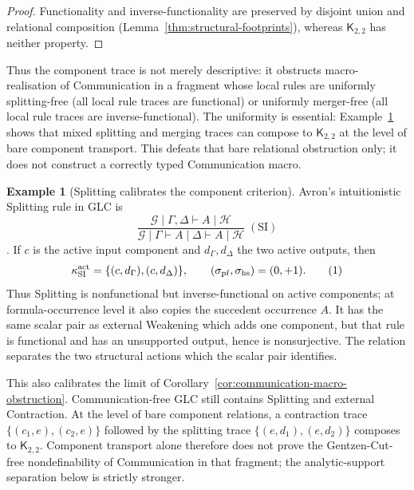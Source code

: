 \documentclass[10pt,a4paper]{article}
\theoremstyle{plain}
\theoremstyle{definition}
\newtheorem{example}[theorem]{Example}
\theoremstyle{remark}
\newcommand{\ms}{\mathrel{\vdash}}
\newcommand{\eqtag}{\refstepcounter{equation}\tag{\theequation}}
\begin{document}
\begin{proof}
Functionality and inverse-functionality are preserved by disjoint union
and relational composition
(Lemma~\ref{thm:structural-footprints}), whereas
\(\mathsf K_{2,2}\) has neither property.
\end{proof}

Thus the component trace is not merely descriptive: it obstructs
macro-realisation of Communication in a fragment whose local
rules are uniformly splitting-free (all local rule traces are functional)
or uniformly merger-free (all local rule traces are inverse-functional).  The uniformity
is essential: Example~\ref{ex:splitting-component-calibration} shows that
mixed splitting and merging traces can compose to \(\mathsf K_{2,2}\) at
the level of bare component transport.  This defeats that bare relational
obstruction only; it does not construct a correctly typed Communication
macro.

\begin{example}[Splitting calibrates the component criterion]
\label{ex:splitting-component-calibration}
Avron's intuitionistic Splitting rule in GLC is
\[
\frac{
 \mathcal G\mid\Gamma,\Delta\ms A\mid\mathcal H
}{
 \mathcal G\mid\Gamma\ms A
 \mid\Delta\ms A\mid\mathcal H
}\;(\mathrm{SI})
\]
\cite[\S III.1.2]{avron1996hypersequents}.  If \(c\) is the active
input component and \(d_\Gamma,d_\Delta\) the two active outputs, then
\[
 \kappa_{\mathrm{SI}}^{\mathrm{act}}
   =\{(c,d_\Gamma),(c,d_\Delta)\},\qquad
 (\sigma_{\mathrm{pf}},\sigma_{\mathrm{hs}})=(0,+1).
\eqtag\label{eq:splitting-component-profile}
\]
Thus Splitting is nonfunctional but inverse-functional on active
components; at formula-occurrence level it also copies the succedent
occurrence \(A\).  It has the same scalar pair as external Weakening
which adds one component, but that rule is functional and has an
unsupported output, hence is nonsurjective.  The relation separates the
two structural actions which the scalar pair identifies.

This also calibrates the limit of
Corollary~\ref{cor:communication-macro-obstruction}.  Communication-free
GLC still contains Splitting and external Contraction.  At the level of
bare component relations, a contraction trace
\(
\{(c_1,e),(c_2,e)\}
\)
followed by the splitting trace
\(
\{(e,d_1),(e,d_2)\}
\)
composes to \(\mathsf K_{2,2}\).  Component transport alone therefore
does not prove the Gentzen-Cut-free nondefinability of Communication in
that fragment; the analytic-support separation below is strictly
stronger.
\end{example}
\end{document}
